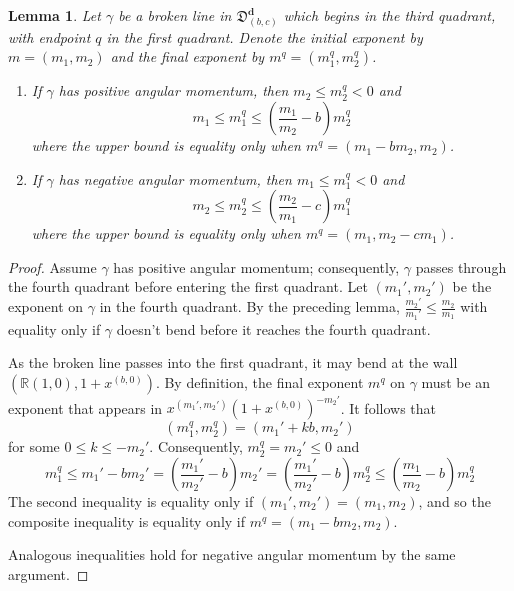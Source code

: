 \documentclass[11pt]{amsart}
\newtheorem{lemma}{Lemma}[section]
\theoremstyle{remark}
\numberwithin{equation}{section}
\begin{document}
\begin{lemma}
Let $\gamma$ be a broken line in $\mathfrak{D}_{(b,c)}^{\mathbf{d}}$ which begins in the third quadrant, with endpoint $q$ in the first quadrant.  Denote the  initial exponent by $m=(m_1,m_2)$ and the final exponent by $m^q=(m_1^q,m_2^q)$.  
\begin{enumerate}
	\item If $\gamma$ has positive angular momentum, then $m_2\leq m_2^q<0$ and
	\[ m_1\leq m_1^q\leq\left( \frac{m_1}{m_2}-b\right)m_2^q\]
	where the upper bound is equality only when $m^q =( m_1-bm_2,m_2)$.
	\item If $\gamma$ has negative angular momentum, then $m_1\leq  m_1^q<0$ and
	\[ m_2 \leq m_2^q\leq\left( \frac{m_2}{m_1}-c\right)m_1^q\]
	where the upper bound is equality only when $m^q =( m_1,m_2-cm_1)$.
\end{enumerate}
\end{lemma}
\begin{proof}
Assume $\gamma$ has positive angular momentum; consequently, $\gamma$ passes through the fourth quadrant before entering the first quadrant.  Let $(m_1',m_2')$ be the exponent on $\gamma$ in the fourth quadrant.  By the preceding lemma, $\frac{m_2'}{m_1'}\leq \frac{m_2}{m_1}$ with equality only if $\gamma$ doesn't bend before it reaches the fourth quadrant.  

As the broken line passes into the first quadrant, it may bend at the wall $(\mathbb{R}(1,0),1+x^{(b,0)})$.  By definition, the final exponent $m^q$ on $\gamma$ must be an exponent that appears in $x^{(m_1',m_2')}(1+x^{(b,0)})^{-m_2'}$.  It follows that%
\[ (m_1^q,m_2^q) = (m_1'+kb,m_2')\]
for some $0\leq k\leq -m_2'$.
Consequently, $m_2^q=m_2'\leq0$ and 
\[ m_1^q\leq m_1' - bm_2' = \left(\frac{m_1'}{m_2'} - b\right) m_2'  = \left(\frac{m_1'}{m_2'} - b\right) m_2^q \leq \left(\frac{m_1}{m_2} - b\right) m_2^q\]
The second inequality is equality only if $(m_1',m_2')=(m_1,m_2)$, and so the composite inequality is equality only if $m^q =( m_1-bm_2,m_2)$.

Analogous inequalities hold for negative angular momentum by the same argument.
\end{proof}
\end{document}
